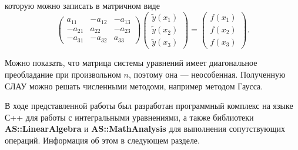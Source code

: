 \documentclass{spisok-article}
\begin{document}
которую можно записать в матричном виде
$$
\left(
\begin{array}{ccc}
	a_{11} & -a_{12} & -a_{13}\\
	-a_{21} & a_{22} & -a_{23}\\
	-a_{31} & -a_{32} & a_{33}
\end{array}
\right)
\left(
\begin{array}{c}
	\tilde y\left(x_1\right)\\
	\tilde y\left(x_2\right)\\
	\tilde y\left(x_3\right)
\end{array}
\right)=
\left(
\begin{array}{c}
	f\left(x_1\right)\\
	f\left(x_2\right)\\
	f\left(x_3\right)
\end{array}
\right).
$$

Можно показать, что матрица системы уравнений имеет диагональное преобладание при произвольном $n$, поэтому она --- неособенная. Полученную СЛАУ можно решать численными методоми, например методом Гаусса.


В ходе представленной работы был разработан программный комплекс на языке С++ для работы с интегральными уравнениями, а также библиотеки \textbf{AS::LinearAlgebra} и \textbf{AS::MathAnalysis} для выполнения сопутствующих операций. Информация об этом в следующем разделе. %


\end{document}

